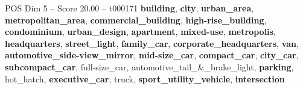 \begin{textsample}{POS Dim 5 – Score 20.00 – t000171}  \label{ex:f5_pos_012}
\textbf{building}, \textbf{city}, \textbf{urban\_area}, \textbf{metropolitan\_area}, \textbf{commercial\_building}, \textbf{high-rise\_building}, \textbf{condominium}, \textbf{urban\_design}, \textbf{apartment}, \textbf{mixed-use}, \textbf{metropolis}, \textbf{headquarters}, \textbf{street\_light}, \textbf{family\_car}, \textbf{corporate\_headquarters}, \textbf{van}, \textbf{automotive\_side-view\_mirror}, \textbf{mid-size\_car}, \textbf{compact\_car}, \textbf{city\_car}, \textbf{subcompact\_car}, full-size\_car, automotive\_tail\_\&\_brake\_light, \textbf{parking}, hot\_hatch, \textbf{executive\_car}, truck, \textbf{sport\_utility\_vehicle}, \textbf{intersection}

\end{textsample}
